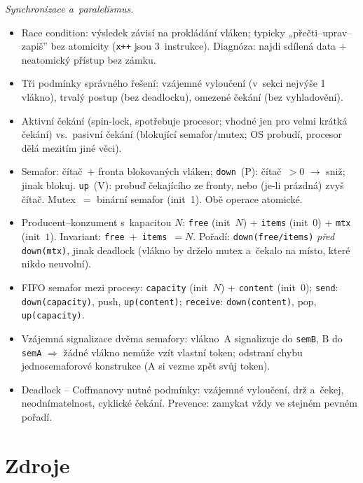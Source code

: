 \documentclass[11pt,a4paper]{article}
\begin{document}
\begin{poznamka}
\smallskip
\emph{Synchronizace a~paralelismus.}
\begin{itemize}
  \item Race condition: výsledek závisí na prokládání vláken; typicky „přečti--uprav--zapiš'' bez atomicity (\texttt{x++} jsou 3~instrukce). Diagnóza: najdi sdílená data + neatomický přístup bez zámku.
  \item Tři podmínky správného řešení: vzájemné vyloučení (v~sekci nejvýše 1 vlákno), trvalý postup (bez deadlocku), omezené čekání (bez vyhladovění).
  \item Aktivní čekání (spin-lock, spotřebuje procesor; vhodné jen pro velmi krátká čekání) vs.\ pasivní čekání (blokující semafor/mutex; OS probudí, procesor dělá mezitím jiné věci).
  \item Semafor: čítač~$+$ fronta blokovaných vláken; \texttt{down}~(P): čítač~$>0$ $\to$ sniž; jinak blokuj. \texttt{up}~(V): probuď čekajícího ze fronty, nebo (je-li prázdná) zvyš čítač. Mutex~$=$ binární semafor (init~1). Obě operace atomické.
  \item Producent--konzument s~kapacitou $N$: \texttt{free} (init~$N$) + \texttt{items} (init~$0$) + \texttt{mtx} (init~$1$). Invariant: \texttt{free}~$+$~\texttt{items}~$= N$. Pořadí: \texttt{down(free/items)} \emph{před} \texttt{down(mtx)}, jinak deadlock (vlákno by drželo mutex a~čekalo na místo, které nikdo neuvolní).
  \item FIFO semafor mezi procesy: \texttt{capacity} (init~$N$) + \texttt{content} (init~$0$); \texttt{send}: \texttt{down(capacity)}, push, \texttt{up(content)}; \texttt{receive}: \texttt{down(content)}, pop, \texttt{up(capacity)}.
  \item Vzájemná signalizace dvěma semafory: vlákno~A signalizuje do \texttt{semB}, B do \texttt{semA} $\Rightarrow$ žádné vlákno nemůže vzít vlastní token; odstraní chybu jednosemaforové konstrukce (A si vezme zpět svůj token).
  \item Deadlock -- Coffmanovy nutné podmínky: vzájemné vyloučení, drž a~čekej, neodnímatelnost, cyklické čekání. Prevence: zamykat vždy ve stejném pevném pořadí.
\end{itemize}
\end{poznamka}

\section*{Zdroje}
\end{document}
